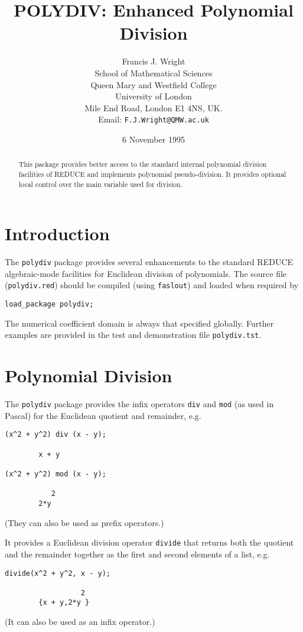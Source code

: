 \documentclass[11pt]{article}
\title{POLYDIV: Enhanced Polynomial Division}
\author{Francis J. Wright \\
School of Mathematical Sciences \\
Queen Mary and Westfield College \\
University of London \\
Mile End Road, London E1 4NS, UK. \\
Email: {\tt F.J.Wright@QMW.ac.uk}}
\date{6 November 1995}
\begin{document}
\maketitle

\begin{abstract}
  This package provides better access to the standard internal
  polynomial division facilities of REDUCE and implements polynomial
  pseudo-division.  It provides optional local control over the main
  variable used for division.
\end{abstract}


\section{Introduction}

The \texttt{polydiv} package provides several enhancements to the
standard REDUCE algebraic-mode facilities for Euclidean division of
polynomials.  The source file (\texttt{polydiv.red}) should be
compiled (using \texttt{faslout}) and loaded when required by
\begin{verbatim}
load_package polydiv;
\end{verbatim}
The numerical coefficient domain is always that specified globally.
Further examples are provided in the test and demonstration file
\texttt{polydiv.tst}.


\section{Polynomial Division}

The \texttt{polydiv} package provides the infix operators \texttt{div}
and \texttt{mod} (as used in Pascal) for the Euclidean quotient and
remainder, e.g.
\begin{verbatim}
(x^2 + y^2) div (x - y);

        x + y

(x^2 + y^2) mod (x - y);

           2
        2*y
\end{verbatim}
(They can also be used as prefix operators.)

It provides a Euclidean division operator \texttt{divide} that returns
both the quotient and the remainder together as the first and second
elements of a list, e.g.
\begin{verbatim}
divide(x^2 + y^2, x - y);

                  2
        {x + y,2*y }
\end{verbatim}
(It can also be used as an infix operator.)
\end{document}
